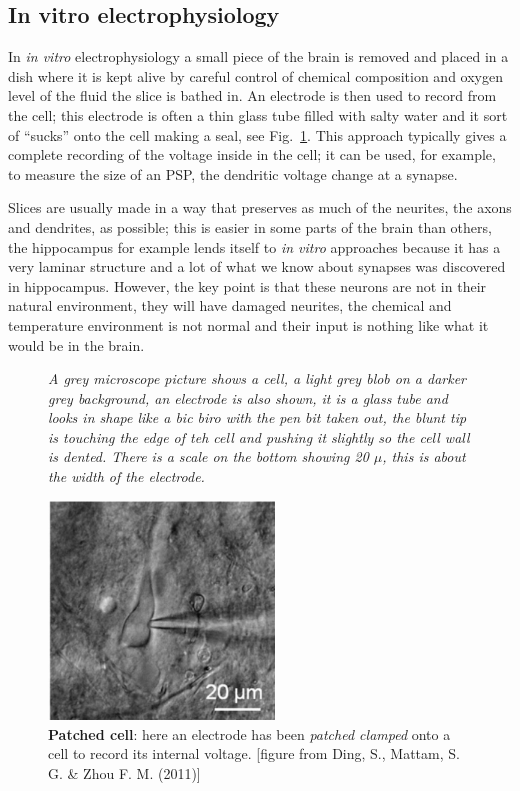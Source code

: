 \documentclass[12pt]{article}
\begin{document}
\subsection*{In vitro electrophysiology}

In \textsl{in vitro} electrophysiology a small piece of the brain is
removed and placed in a dish where it is kept alive by careful control
of chemical composition and oxygen level of the fluid the slice is
bathed in. An electrode is then used to record from the cell; this
electrode is often a thin glass tube filled with salty water and it
sort of ``sucks'' onto the cell making a seal, see
Fig.~\ref{fig:patch}. This approach typically gives a complete
recording of the voltage inside in the cell; it can be used, for
example, to measure the size of an PSP, the dendritic voltage change
at a synapse.

Slices are usually made in a way that preserves as much of the
neurites, the axons and dendrites, as possible; this is easier in some
parts of the brain than others, the hippocampus for example lends
itself to \textsl{in vitro} approaches because it has a very laminar
structure and a lot of what we know about synapses was discovered in
hippocampus. However, the key point is that these neurons are not in
their natural environment, they will have damaged neurites, the
chemical and temperature environment is not normal and their input is
nothing like what it would be in the brain.

\begin{figure}
{\textsl{A grey microscope picture shows a cell, a light grey blob on a darker grey background, an electrode is also shown, it is a glass tube and looks in shape like a bic biro with the pen bit taken out, the blunt tip is touching the edge of teh cell and pushing it slightly so the cell wall is dented. There is a scale on the bottom showing 20 $\mu$, this is about the width of the electrode.}}
{
  \begin{center}
    \includegraphics[width=6cm]{patch.png}
  \end{center}
  }
  \caption{\textbf{Patched cell}: here an electrode has been \textsl{patched clamped} onto a cell to record its internal voltage. [figure from Ding, S., Mattam, S. G. \& Zhou F. M. (2011)]\label{fig:patch}}
\end{figure}
\end{document}
